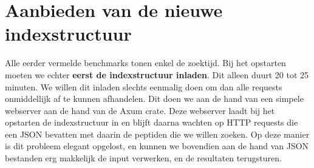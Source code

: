 \section{Aanbieden van de nieuwe indexstructuur}\label{sec:aanbieden-van-de-nieuwe-indexstructuur}
Alle eerder vermelde benchmarks tonen enkel de zoektijd.
Bij het opstarten moeten we echter \textbf{eerst de indexstructuur inladen}.
Dit alleen duurt 20 tot 25 minuten.
We willen dit inladen slechts eenmalig doen om dan alle requests onmiddellijk af te kunnen afhandelen.
Dit doen we aan de hand van een simpele webserver aan de hand van de Axum crate\cite{axum}.
Deze webserver laadt bij het opstarten de indexstructuur in en blijft daarna wachten op HTTP requests die een JSON bevatten met daarin de peptiden die we willen zoeken.
Op deze manier is dit probleem elegant opgelost, en kunnen we bovendien aan de hand van JSON bestanden erg makkelijk de input verwerken, en de resultaten terugsturen.


